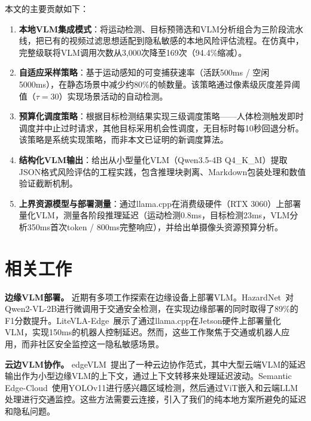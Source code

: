 \documentclass[a4paper,10pt]{ctexart}
\begin{document}
本文的主要贡献如下：

\begin{enumerate}
\item \textbf{本地VLM集成模式}：将运动检测、目标预筛选和VLM分析组合为三阶段流水线，把已有的视频过滤思想适配到隐私敏感的本地风险评估流程。在仿真中，完整级联将VLM调用次数从3,000次降至169次（94.4\%缩减）。

\item \textbf{自适应采样策略}：基于运动感知的可变捕获速率（活跃500ms / 空闲5000ms），在静态场景中减少约80\%的帧数量。该策略通过像素级灰度差异阈值（$\tau=30$）实现场景活动的自动检测。

\item \textbf{预算化调度策略}：根据目标检测结果实现三级调度策略——人体检测触发即时调度并中止过时请求，其他目标采用机会性调度，无目标时每10秒回退分析。该策略是系统实现策略，而非本文已证明的新调度算法。

\item \textbf{结构化VLM输出}：给出从小型量化VLM（Qwen3.5-4B Q4\_K\_M）提取JSON格式风险评估的工程实践，包含推理块剥离、Markdown包装处理和数值验证截断机制。

\item \textbf{上界资源模型与部署测量}：通过llama.cpp在消费级硬件（RTX 3060）上部署量化VLM，测量各阶段推理延迟（运动检测0.8ms，目标检测23ms，VLM分析350ms首次token / 800ms完整响应），并给出单摄像头资源预算分析。
\end{enumerate}

\section{相关工作}

\textbf{边缘VLM部署。}
近期有多项工作探索在边缘设备上部署VLM。HazardNet~\cite{tami2025hazardnet}对Qwen2-VL-2B进行微调用于交通安全检测，在实现边缘部署的同时取得了89\%的F1分数提升。LiteVLA-Edge~\cite{williams2026litevla}展示了通过llama.cpp在Jetson硬件上部署量化VLM，实现150ms的机器人控制延迟。然而，这些工作聚焦于交通或机器人应用，而非社区安全监控这一隐私敏感场景。

\textbf{云边VLM协作。}
edgeVLM~\cite{qian2025edgevlm}提出了一种云边协作范式，其中大型云端VLM的延迟输出作为小型边缘VLM的上下文，通过上下文转移来处理延迟波动。Semantic Edge-Cloud~\cite{onsu2025semantic}使用YOLOv11进行感兴趣区域检测，然后通过ViT嵌入和云端LLM处理进行交通监控。这些方法需要云连接，引入了我们的纯本地方案所避免的延迟和隐私问题。
\end{document}
